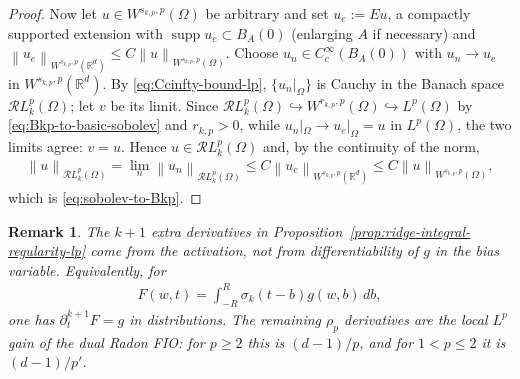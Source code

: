 \documentclass[12pt]{article}
\numberwithin{equation}{section}
\newtheorem{remark}{Remark}
\numberwithin{figure}{section}
\numberwithin{equation}{section}
\newcommand{\R}{\mathbb{R}}
\newcommand{\norm}[1]{\left\|#1\right\|}
\DeclareMathOperator{\supp}{supp}
\begin{document}
\begin{proof}
Now let $u\in W^{s_{k,p},p}(\Omega)$ be arbitrary and set $u_e:=Eu$, a compactly
supported extension with $\supp u_e\subset B_A(0)$ (enlarging $A$ if necessary)
and $\norm{u_e}_{W^{s_{k,p},p}(\R^d)}\le C\norm{u}_{W^{s_{k,p},p}(\Omega)}$.
Choose $u_n\in C_c^\infty(B_A(0))$ with $u_n\to u_e$ in $W^{s_{k,p},p}(\R^d)$.  By
\eqref{eq:Ccinfty-bound-lp}, $\{u_n|_\Omega\}$ is Cauchy in the Banach space
$\mathcal{R}L^p_k(\Omega)$; let $v$ be its limit.  Since
$\mathcal{R}L^p_k(\Omega)\hookrightarrow W^{r_{k,p},p}(\Omega)\hookrightarrow
L^p(\Omega)$ by \eqref{eq:Bkp-to-basic-sobolev} and $r_{k,p}>0$, while
$u_n|_\Omega\to u_e|_\Omega=u$ in $L^p(\Omega)$, the two limits agree: $v=u$.
Hence $u\in\mathcal{R}L^p_k(\Omega)$ and, by the continuity of the norm,
\begin{align*}
    \norm{u}_{\mathcal{R}L^p_k(\Omega)}
    =\lim_{n}\norm{u_n}_{\mathcal{R}L^p_k(\Omega)}
    \le C\norm{u_e}_{W^{s_{k,p},p}(\R^d)}
    \le C\norm{u}_{W^{s_{k,p},p}(\Omega)},
\end{align*}
which is \eqref{eq:sobolev-to-Bkp}.
\end{proof}

\begin{remark}
\label{rem:relu-k-derivative-count}
The $k+1$ extra derivatives in
Proposition~\ref{prop:ridge-integral-regularity-lp} come from the activation, not
from differentiability of $g$ in the bias variable.  Equivalently, for
\begin{align*}
    F(w,t)=\int_{-R}^R\sigma_k(t-b)g(w,b)\,db,
\end{align*}
one has $\partial_t^{k+1}F=g$ in distributions.  The remaining
$\rho_p$ derivatives are the local $L^p$ gain of the dual Radon FIO: for $p\ge2$
this is $(d-1)/p$, and for $1<p\le2$ it is $(d-1)/p'$.
\end{remark}
\end{document}
